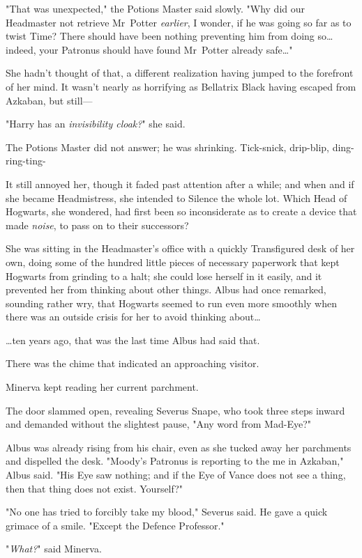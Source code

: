 "That was unexpected," the Potions Master said slowly. "Why did our Headmaster
not retrieve Mr~Potter \emph{earlier}, I wonder, if he was going so far as to
twist Time? There should have been nothing preventing him from doing so…indeed,
your Patronus should have found Mr~Potter already safe…"

She hadn't thought of that, a different realization having jumped to the
forefront of her mind. It wasn't nearly as horrifying as Bellatrix Black having
escaped from Azkaban, but still---

"Harry has an \emph{invisibility cloak?}" she said.

The Potions Master did not answer; he was shrinking.
\later
Tick-snick, drip-blip, ding-ring-ting-

It still annoyed her, though it faded past attention after a while; and when
and if she became Headmistress, she intended to Silence the whole lot. Which
Head of Hogwarts, she wondered, had first been so inconsiderate as to create a
device that made \emph{noise}, to pass on to their successors?

She was sitting in the Headmaster's office with a quickly Transfigured desk of
her own, doing some of the hundred little pieces of necessary paperwork that
kept Hogwarts from grinding to a halt; she could lose herself in it easily, and
it prevented her from thinking about other things. Albus had once remarked,
sounding rather wry, that Hogwarts seemed to run even more smoothly when there
was an outside crisis for her to avoid thinking about…

…ten years ago, that was the last time Albus had said that.

There was the chime that indicated an approaching visitor.

Minerva kept reading her current parchment.

The door slammed open, revealing Severus Snape, who took three steps inward and
demanded without the slightest pause, "Any word from Mad-Eye?"

Albus was already rising from his chair, even as she tucked away her parchments
and dispelled the desk. "Moody's Patronus is reporting to the me in Azkaban,"
Albus said. "His Eye saw nothing; and if the Eye of Vance does not see a thing,
then that thing does not exist. Yourself?"

"No one has tried to forcibly take my blood," Severus said. He gave a quick
grimace of a smile. "Except the Defence Professor."

"\emph{What?}" said Minerva.

